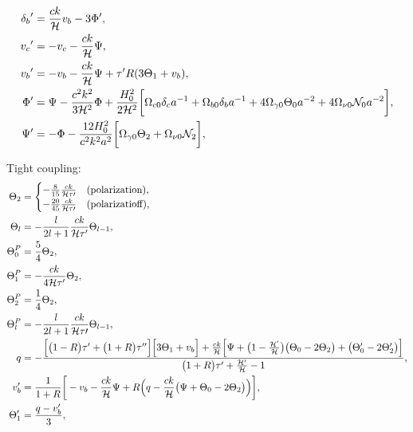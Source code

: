 \documentclass[10pt,a4paper]{article}
\begin{document}
\begin{subequations}
\begin{align}
	{\delta_b}^\prime   &= \frac{ck}{\mathcal{H}} v_b - 3 \Phi^\prime , \\
	{v_c}^\prime        &= -v_c - \frac{ck}{\mathcal{H}} \Psi , \\
	{v_b}^\prime        &= -v_b - \frac{ck}{\mathcal{H}} \Psi + \tau^\prime R (3\Theta_1 + v_b), \\
	{\Phi}^\prime       &= \Psi - \frac{c^2 k^2}{3 \mathcal{H}^2} \Phi + \frac{H_0^2}{2 \mathcal{H}^2} \bigg[ \Omega_{c0} \delta_c a^{-1} + \Omega_{b0} \delta_b a^{-1} + 4 \Omega_{\gamma 0} \Theta_0 a^{-2} + 4 \Omega_{\nu 0} \mathcal{N}_0 a^{-2} \bigg] , \\
	{\Psi}^\prime       &= -\Phi - \frac{12 H_0^2}{c^2 k^2 a^2} \bigg[ \Omega_{\gamma 0} \Theta_2 + \Omega_{\nu 0} \mathcal{N}_2 \bigg] ,
\end{align}
\label{eq_perturb_full}
\end{subequations}

Tight coupling:
\begin{subequations}
\begin{align}
	\Theta_2   &= \begin{cases} -\frac{8}{15} \frac{ck}{\mathcal{H} \tau\prime} & \text{(polarization)}, \\ -\frac{20}{45} \frac{ck}{\mathcal{H} \tau\prime} & \text{(polarizatioff),} \end{cases} \\
	\Theta_l   &= -\frac{l}{2l+1} \frac{ck}{\mathcal{H} \tau^\prime} \Theta_{l-1}, \\
	\Theta^P_0 &= \frac54 \Theta_2 , \\
	\Theta^P_1 &= -\frac{ck}{4\mathcal{H} \tau^\prime} \Theta_2 , \\
	\Theta^P_2 &= \frac14 \Theta_2 , \\
	\Theta^P_l &= -\frac{l}{2l+1} \frac{ck}{\mathcal{H} \tau\prime} \Theta_{l-1}, \\
	q &= - \frac{\Big[\big(1-R\big)\tau^\prime+\big(1+R\big)\tau^{\prime\prime}\Big] \Big[ 3\Theta_1+v_b \Big] + \frac{ck}{\mathcal{H}} \Big[ \Psi + \big(1-\frac{\mathcal{H}^\prime}{\mathcal{H}}\big)\big(\Theta_0-2\Theta_2\big) + \big(\Theta_0^\prime - 2 \Theta_2^\prime\big) \Big]}{\big(1+R\big)\tau^\prime + \frac{\mathcal{H}^\prime}{\mathcal{H}}-1}, \\
	v_b^\prime &= \frac{1}{1+R} \bigg[ -v_b - \frac{ck}{\mathcal{H}} \Psi + R \Big( q - \frac{ck}{\mathcal{H}} \big(\Psi + \Theta_0 - 2 \Theta_2 \big) \Big) \bigg], \\
	\Theta_1^\prime &= \frac{q - v_b^\prime}{3},
\end{align}
\label{eq_perturb_tight}
\end{subequations}
\end{document}
